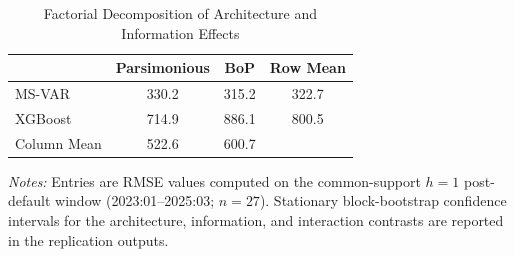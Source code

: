 \begin{table}[htbp]
\centering
\caption{Factorial Decomposition of Architecture and Information Effects}
\label{tab:did}
\begin{tabular}{lcc|c}
\toprule
& Parsimonious & BoP & Row Mean \\
\midrule
MS-VAR & 330.2 & 315.2 & 322.7 \\
XGBoost & 714.9 & 886.1 & 800.5 \\
\midrule
Column Mean & 522.6 & 600.7 & \\
\bottomrule
\end{tabular}
\begin{tablenotes}
\small
\item \textit{Notes:} Entries are RMSE values computed on the common-support $h=1$ post-default window (2023:01--2025:03; $n=27$). Stationary block-bootstrap confidence intervals for the architecture, information, and interaction contrasts are reported in the replication outputs.
\end{tablenotes}
\end{table}
